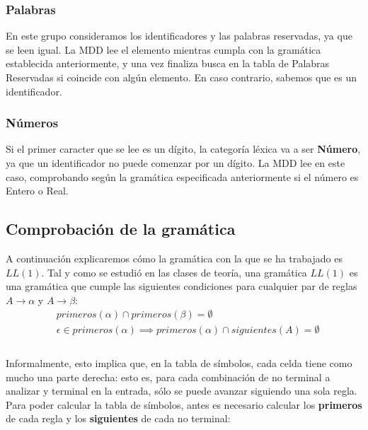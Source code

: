 \documentclass[11pt]{article}
\begin{document}
\subsubsection{Palabras}
En este grupo consideramos los identificadores y las palabras reservadas, ya que se leen igual. La MDD lee el elemento mientras cumpla con la gramática establecida anteriormente, y una vez finaliza busca en la tabla de Palabras Reservadas si coincide con algún elemento. En caso contrario, sabemos que es un identificador. 

\subsubsection{Números}
Si el primer caracter que se lee es un dígito, la categoría léxica va a ser \textbf{Número}, ya que un identificador no puede comenzar por un dígito. La MDD lee en este caso, comprobando según la gramática especificada anteriormente si el número es Entero o Real.

\subsection{Comprobación de la gramática}
A continuación explicaremos cómo la gramática con la que se ha trabajado es $LL(1)$. Tal y como se estudió en las clases de teoría, una gramática $LL(1)$ es una gramática que cumple las siguientes condiciones para cualquier par de reglas $A \rightarrow \alpha$ y $A \rightarrow \beta$:
\begin{align*}
	& primeros(\alpha) \cap primeros(\beta) = \emptyset \\
	& \epsilon \in primeros(\alpha) \implies primeros(\alpha) \cap siguientes(A) = \emptyset\\
\end{align*}
\\
Informalmente, esto implica que, en la tabla de símbolos, cada celda tiene como mucho una parte derecha: esto es, para cada combinación de no terminal a analizar y terminal en la entrada, sólo se puede avanzar siguiendo una sola regla. Para poder calcular la tabla de símbolos, antes es necesario calcular los \textbf{primeros} de cada regla y los \textbf{siguientes} de cada no terminal:\\
\end{document}
